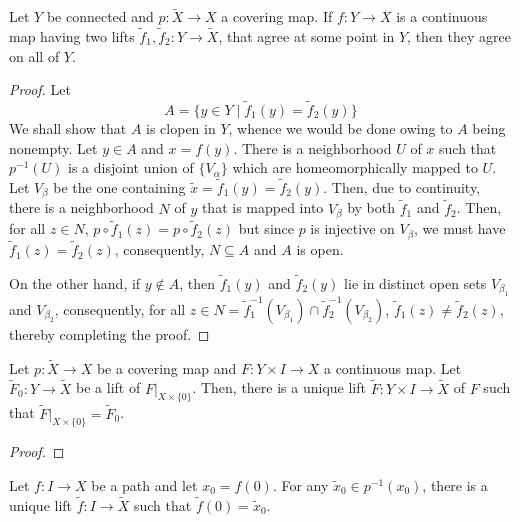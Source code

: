 \begin{theorem}
    Let $Y$ be connected and $p:\widetilde X\to X$ a covering map. If $f: Y\to X$ is a continuous map having two lifts $\widetilde f_1,\widetilde f_2: Y\to\widetilde X$, that agree at some point in $Y$, then they agree on all of $Y$.
\end{theorem}
\begin{proof}
    Let 
    \begin{equation*}
        A = \{y\in Y\mid \widetilde f_1(y) = \widetilde f_2(y)\}
    \end{equation*}
    We shall show that $A$ is clopen in $Y$, whence we would be done owing to $A$ being nonempty. Let $y\in A$ and $x = f(y)$. There is a neighborhood $U$ of $x$ such that $p^{-1}(U)$ is a disjoint union of $\{V_\alpha\}$ which are homeomorphically mapped to $U$. Let $V_\beta$ be the one containing $\widetilde x = \widetilde f_1(y) = \widetilde f_2(y)$. Then, due to continuity, there is a neighborhood $N$ of $y$ that is mapped into $V_\beta$ by both $\widetilde f_1$ and $\widetilde f_2$. Then, for all $z\in N$, $p\circ\widetilde f_1(z) = p\circ\widetilde f_2(z)$ but since $p$ is injective on $V_\beta$, we must have $\widetilde f_1(z) = \widetilde f_2(z)$, consequently, $N\subseteq A$ and $A$ is open.

    On the other hand, if $y\notin A$, then $\widetilde f_1(y)$ and $\widetilde f_2(y)$ lie in distinct open sets $V_{\beta_1}$ and $V_{\beta_2}$, consequently, for all $z\in N = \widetilde f_1^{-1}(V_{\beta_1})\cap\widetilde f_2^{-1}(V_{\beta_2})$, $\widetilde f_1(z)\ne\widetilde f_2(z)$, thereby completing the proof.
\end{proof}

\begin{theorem}
    Let $p:\widetilde X\to X$ be a covering map and $F: Y\times I\to X$ a continuous map. Let $\widetilde F_0: Y\to\widetilde X$ be a lift of $F|_{X\times\{0\}}$. Then, there is a unique lift $\widetilde F: Y\times I\to\widetilde X$ of $F$ such that $\widetilde F|_{X\times\{0\}} = \widetilde F_0$.
\end{theorem}
\begin{proof}
\end{proof}

\begin{proposition}
    Let $f: I\to X$ be a path and let $x_0 = f(0)$. For any $\widetilde x_0\in p^{-1}(x_0)$, there is a unique lift $\widetilde f: I\to\widetilde X$ such that $\widetilde f(0) = \widetilde x_0$.
\end{proposition}

